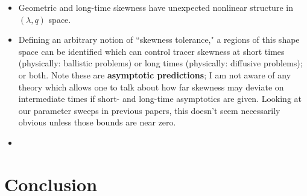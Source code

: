 \documentclass{amsart}
\begin{document}
\begin{itemize}
\item Geometric and long-time skewness have unexpected nonlinear 
structure in $(\lambda,q)$ space.
\item Defining an arbitrary notion of ``skewness tolerance," a 
regions of this shape space can be identified which can control 
tracer skewness at short times (physically: ballistic problems) 
or long times (physically: diffusive problems); or both. Note these are 
\textbf{asymptotic predictions}; I am not aware of any theory 
which allows one to talk about how far skewness may deviate 
on intermediate times if short- and long-time asymptotics are 
given. Looking at our parameter sweeps in previous papers, 
this doesn't seem necessarily obvious unless those bounds are 
near zero.
\item 
\end{itemize}

\section{Conclusion}
\lipsum[1]
\end{document}
